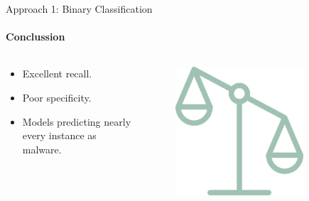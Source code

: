 \documentclass[9pt, pstricks, xcolor=dvipsnames]{beamer}
\begin{document}
\begin{frame}{Approach 1: Binary Classification}
\framesubtitle{Conclussion}
\begin{columns}
    \begin{column}{0.5\textwidth}
	\begin{itemize}
	    \item Excellent recall.
	    \item Poor specificity.
	    \item Models predicting nearly every instance as malware.
	\end{itemize}
    \end{column}
    \begin{column}{0.5\textwidth}
        \begin{figure}
            \centering
            \includegraphics[width=0.8\textwidth]{images/scale.png}
        \end{figure}
    \end{column}

\end{columns}
\end{frame}
\end{document}
